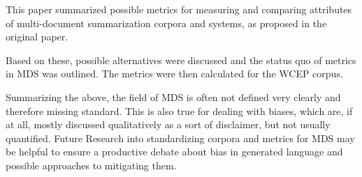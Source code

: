 \documentclass[../main.tex]{subfiles}
\begin{document}
This paper summarized possible metrics for measuring and comparing attributes of multi-document summarization corpora and systems, as proposed in the original paper. \cite{dey-etal-2020-corpora}

Based on these, possible alternatives were discussed and the status quo of metrics in MDS was outlined. The metrics were then calculated for the WCEP corpus.

Summarizing the above, the field of MDS is often not defined very clearly and therefore missing standard.
This is also true for dealing with biases, which are, if at all, mostly discussed qualitatively as a sort of disclaimer, but not usually quantified.
Future Research into standardizing corpora and metrics for MDS may be helpful to ensure a productive debate about bias in generated language and possible approaches to mitigating them.
\end{document}
